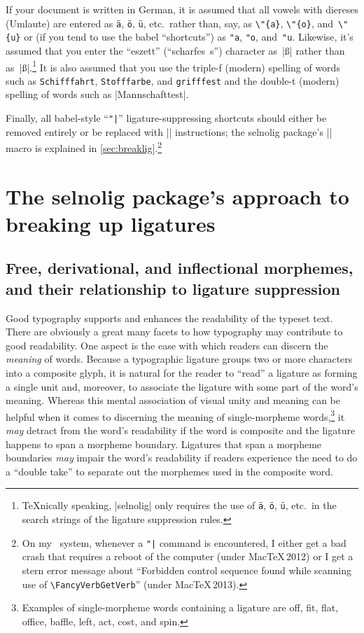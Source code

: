 \documentclass[11pt]{article}
\newcommand{\pkg}[1]{\textsf{#1}}
\newcommand{\cmmd}[1]{\texttt{\textbackslash #1}}
\begin{document}
If your document is written in German, it is assumed that all vowels with diereses (Umlaute) are entered as \Verb|ä|, \Verb|ö|, \Verb|ü|, etc.\ rather than, say, as \Verb|\"{a}|, \Verb|\"{o}|, and~\Verb|\"{u}| or (if you tend to use the \pkg{babel} \enquote{shortcuts}) as \Verb|"a|, \Verb|"o|, and~\Verb|"u|. Likewise, it's assumed that you enter the \enquote{eszett} (\enquote{scharfes~s}) character as~|ß| rather than as~|\ss|.\footnote{\TeX nically speaking, |selnolig| only requires the use of \Verb|ä|, \Verb|ö|, \Verb|ü|, etc.\ in the search strings of the ligature suppression rules.} It is also assumed that you use the triple-f (modern) spelling of words such as \texttt{Schifffahrt}, \texttt{Stofffarbe}, and \texttt{grifffest} and the double-t (modern) spelling of words such as |Mannschafttest|.

Finally, all \pkg{babel}-style ``\Verb+"|+'' ligature-suppressing shortcuts should either be removed entirely or be replaced with |\breaklig| instructions; the \pkg{selnolig} package's |\breaklig| macro is explained in \cref{sec:breaklig}.\footnote{On my \LuaLaTeX\ system, whenever a \Verb+"|+ command is encountered, I either get a bad crash that requires a reboot of the computer (under Mac\TeX\,2012) or I get a stern error message about \enquote{Forbidden control sequence found while scanning use of \cmmd{FancyVerbGetVerb}} (under Mac\TeX\,2013).}





\section[The selnolig package's approach to breaking up ligatures]{The \pkg{selnolig} package's approach to breaking up ligatures} \label{sec:approach}

\subsection[Free, derivational, and inflectional morphemes]{Free, derivational, and inflectional morphemes, and their relationship to ligature suppression}

Good typography supports and enhances the readability of the typeset text. There are obviously a great many facets to how typography may contribute to good readability. One aspect is the ease with which readers can discern the \emph{meaning} of words. Because a typographic ligature groups two or more characters into a composite glyph, it is natural for the reader to \enquote{read} a ligature as forming a single unit and, moreover, to associate the ligature with some part of the word's meaning. Whereas this mental association of visual unity and meaning can be helpful when it comes to discerning the meaning of single-morpheme words,\footnote{Examples of single-morpheme words containing a ligature are off, fit, flat, office, baffle, left, act, cost, and spin.} it \emph{may} detract from the word's readability if the word is composite and the ligature happens to span a morpheme boundary. Ligatures that span a morpheme boundaries \emph{may} impair the word's readability if readers experience the need to do a \enquote{double take} to separate out the morphemes used in the composite word.
\end{document}
